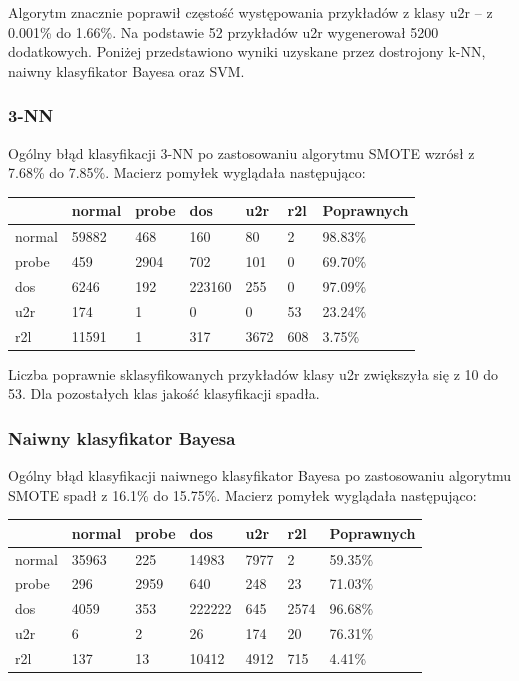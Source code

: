 \documentclass[a4paper, 12pt]{article}
\begin{document}
Algorytm znacznie poprawił częstość występowania przykładów z klasy u2r -- z 0.001\% do 1.66\%.
Na podstawie 52 przykładów u2r wygenerował 5200 dodatkowych.
Poniżej przedstawiono wyniki uzyskane przez dostrojony k-NN, naiwny klasyfikator Bayesa oraz SVM. 

\subsubsection{3-NN}

Ogólny błąd klasyfikacji 3-NN po zastosowaniu algorytmu SMOTE wzrósł z 7.68\% do 7.85\%.
Macierz pomyłek wyglądała następująco:

\begin{table}[H]
\centering
\begin{tabular}{ | l | l | l | l | l | l | l | } \hline
	& normal & probe & dos 	& u2r 	& r2l 	& Poprawnych	\\ \hline
normal &  59882 &   468 &  160  & 80  	&  2 	& 98.83\% \\ \hline
probe  &  459 & 2904  &  702  &  101 	& 0 	& 69.70\% \\ \hline
dos    &  6246  &  192 & 223160 &  255  & 0 	& 97.09\% \\ \hline
u2r    &    174   &  1   &   0 &  0 	& 53 	& 23.24\% \\ \hline
r2l    &  11591   &  1   &   317 &  3672 &  608 & 3.75\% \\ \hline
\end{tabular} 
\end{table}

Liczba poprawnie sklasyfikowanych przykładów klasy u2r zwiększyła się z 10 do 53.
Dla pozostałych klas jakość klasyfikacji spadła.

\subsubsection{Naiwny klasyfikator Bayesa}

Ogólny błąd klasyfikacji naiwnego klasyfikator Bayesa po zastosowaniu algorytmu SMOTE 
spadł z 16.1\% do 15.75\%. Macierz pomyłek wyglądała następująco:

\begin{table}[H]
\centering
\begin{tabular}{ | l | l | l | l | l | l | l | } \hline
	& normal & probe & dos 	& u2r 	& r2l 	& Poprawnych	\\ \hline
normal &  35963 &   225 &  14983  & 7977  &  2 	& 59.35\% \\ \hline
probe  &  296 & 2959  &  640  &  248 	& 23 	& 71.03\% \\ \hline
dos    &  4059  &  353 & 222222 &  645  & 2574 	& 96.68\% \\ \hline
u2r    &    6   &  2   &   26 &  174 	& 20 	& 76.31\% \\ \hline
r2l    &  137   &  13   &   10412 &  4912 &  715 & 4.41\% \\ \hline
\end{tabular} 
\end{table}
\end{document}
